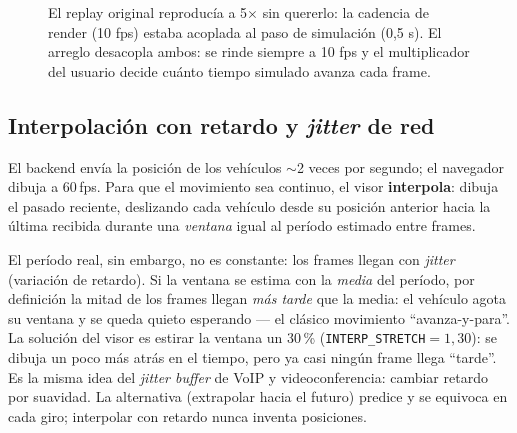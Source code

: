 \documentclass[11pt,a4paper]{article}
\begin{document}
\begin{figure}[h!]
\centering
{}
\caption{El replay original reproducía a 5$\times$ sin quererlo: la cadencia de
render (10 fps) estaba acoplada al paso de simulación (0{,}5 s). El arreglo
desacopla ambos: se rinde siempre a 10 fps y el multiplicador del usuario
decide cuánto tiempo simulado avanza cada frame.}
\label{fig:relojes}
\end{figure}

\subsection{Interpolación con retardo y \emph{jitter} de red}
\label{sec:interp}

El backend envía la posición de los vehículos $\sim$2 veces por segundo; el
navegador dibuja a 60\,fps. Para que el movimiento sea continuo, el visor
\textbf{interpola}: dibuja el pasado reciente, deslizando cada vehículo desde
su posición anterior hacia la última recibida durante una \emph{ventana} igual
al período estimado entre frames.

El período real, sin embargo, no es constante: los frames llegan con
\emph{jitter} (variación de retardo). Si la ventana se estima con la
\emph{media} del período, por definición la mitad de los frames llegan
\emph{más tarde} que la media: el vehículo agota su ventana y se queda quieto
esperando --- el clásico movimiento ``avanza-y-para''. La solución del visor es
estirar la ventana un 30\,\% (\texttt{INTERP\_STRETCH}$=1{,}30$): se dibuja un
poco más atrás en el tiempo, pero ya casi ningún frame llega ``tarde''. Es la
misma idea del \emph{jitter buffer} de VoIP y videoconferencia: cambiar
retardo por suavidad. La alternativa (extrapolar hacia el futuro) predice y
se equivoca en cada giro; interpolar con retardo nunca inventa posiciones.
\end{document}
